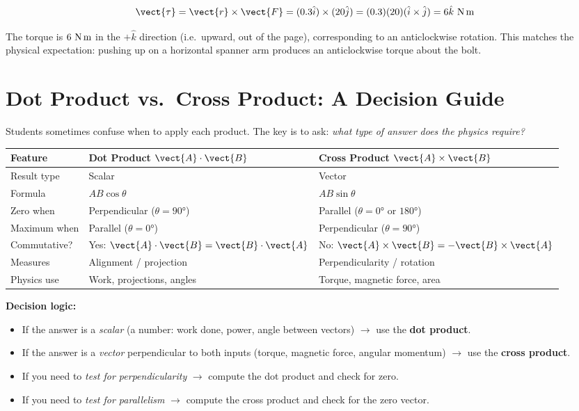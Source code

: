 \begin{solutionbox}
\[
  \vect{\tau} = \vect{r}\times\vect{F}
  = (0.3\hat{i})\times(20\hat{j})
  = (0.3)(20)(\hat{i}\times\hat{j})
  = 6\hat{k}\ \text{N\,m}
\]

The torque is $6\ \text{N\,m}$ in the $+\hat{k}$ direction
(i.e.\ upward, out of the page), corresponding to an
anticlockwise rotation. This matches the physical
expectation: pushing up on a horizontal spanner arm
produces an anticlockwise torque about the bolt.
\end{solutionbox}

\section{Dot Product vs.\ Cross Product: A Decision Guide}
\label{sec:dot_vs_cross}

Students sometimes confuse when to apply each product.
The key is to ask: \textit{what type of answer does the
physics require?}

\begin{keybox}
\centering
\renewcommand{\arraystretch}{1.3}
\begin{tabular}{lll}
\toprule
\textbf{Feature} &
\textbf{Dot Product} $\vect{A}\cdot\vect{B}$ &
\textbf{Cross Product} $\vect{A}\times\vect{B}$\\
\midrule
Result type & Scalar & Vector\\
Formula & $AB\cos\theta$ & $AB\sin\theta$\\
Zero when & Perpendicular ($\theta=90°$)
  & Parallel ($\theta=0°$ or $180°$)\\
Maximum when & Parallel ($\theta=0°$)
  & Perpendicular ($\theta=90°$)\\
Commutative? & Yes: $\vect{A}\cdot\vect{B}
  = \vect{B}\cdot\vect{A}$
  & No: $\vect{A}\times\vect{B}
  = -\vect{B}\times\vect{A}$\\
Measures & Alignment / projection
  & Perpendicularity / rotation\\
Physics use & Work, projections, angles
  & Torque, magnetic force, area\\
\bottomrule
\end{tabular}
\end{keybox}

\textbf{Decision logic:}
\begin{itemize}[noitemsep]
  \item If the answer is a \textit{scalar} (a number:
  work done, power, angle between vectors) $\to$
  use the \textbf{dot product}.
  \item If the answer is a \textit{vector} perpendicular
  to both inputs (torque, magnetic force, angular
  momentum) $\to$ use the \textbf{cross product}.
  \item If you need to \textit{test for perpendicularity}
  $\to$ compute the dot product and check for zero.
  \item If you need to \textit{test for parallelism}
  $\to$ compute the cross product and check for
  the zero vector.
\end{itemize}

